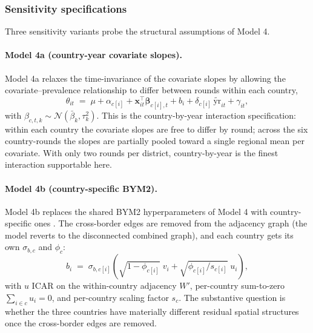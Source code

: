 \documentclass{article}
\begin{document}
\subsubsection{Sensitivity
specifications}\label{sensitivity-specifications}

\label{sec:sens}

Three sensitivity variants probe the structural assumptions of Model 4.

\paragraph{Model 4a (country-year covariate slopes).}

Model 4a relaxes the time-invariance of the covariate slopes by allowing
the covariate--prevalence relationship to differ between rounds within
each country, \begin{equation}
\theta_{it} \;=\; \mu + \alpha_{c[i]} + \mathbf{x}_{it}^{\top} \bm{\beta}_{c[i], t} + b_i + \delta_{c[i]} \, \widetilde{\text{yr}}_{it} + \gamma_{it},
\label{eq:m4a}
\end{equation} with
\(\beta_{c, t, k} \sim \mathcal{N}(\bar{\beta}_k, \tau_k^{2})\). This is
the country-by-year interaction specification: within each country the
covariate slopes are free to differ by round; across the six
country-rounds the slopes are partially pooled toward a single regional
mean per covariate. With only two rounds per district, country-by-year
is the finest interaction supportable here.

\paragraph{Model 4b (country-specific BYM2).}

Model 4b replaces the shared BYM2 hyperparameters of Model 4 with
country-specific ones \citep{donegan2021}. The cross-border edges are
removed from the adjacency graph (the model reverts to the disconnected
combined graph), and each country gets its own \(\sigma_{b, c}\) and
\(\phi_c\): \begin{equation}
b_i \;=\; \sigma_{b, c[i]} \left( \sqrt{1 - \phi_{c[i]}} \; v_i + \sqrt{\phi_{c[i]} / s_{c[i]}} \; u_i \right),
\label{eq:m4b}
\end{equation} with \(u\) ICAR on the within-country adjacency \(W'\),
per-country sum-to-zero \(\sum_{i \in c} u_i = 0\), and per-country
scaling factor \(s_c\). The substantive question is whether the three
countries have materially different residual spatial structures once the
cross-border edges are removed.
\end{document}
